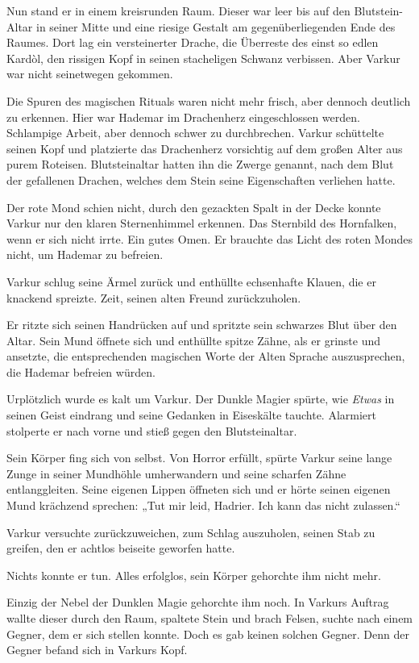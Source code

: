 \documentclass[10pt, a4paper, oneside]{book}
\begin{document}
Nun stand er in einem kreisrunden Raum. Dieser war leer bis auf den Blutstein-Altar in seiner Mitte und eine riesige Gestalt am gegenüberliegenden Ende des Raumes. Dort lag ein versteinerter Drache, die Überreste des einst so edlen Kardòl, den rissigen Kopf in seinen stacheligen Schwanz verbissen. Aber Varkur war nicht seinetwegen gekommen.

Die Spuren des magischen Rituals waren nicht mehr frisch, aber dennoch deutlich zu erkennen. Hier war Hademar im Drachenherz eingeschlossen werden. Schlampige Arbeit, aber dennoch schwer zu durchbrechen. Varkur schüttelte seinen Kopf und platzierte das Drachenherz vorsichtig auf dem großen Alter aus purem Roteisen. Blutsteinaltar hatten ihn die Zwerge genannt, nach dem Blut der gefallenen Drachen, welches dem Stein seine Eigenschaften verliehen hatte.

Der rote Mond schien nicht, durch den gezackten Spalt in der Decke konnte Varkur nur den klaren Sternenhimmel erkennen. Das Sternbild des Hornfalken, wenn er sich nicht irrte. Ein gutes Omen. Er brauchte das Licht des roten Mondes nicht, um Hademar zu befreien.

Varkur schlug seine Ärmel zurück und enthüllte echsenhafte Klauen, die er knackend spreizte. Zeit, seinen alten Freund zurückzuholen.

Er ritzte sich seinen Handrücken auf und spritzte sein schwarzes Blut über den Altar. Sein Mund öffnete sich und enthüllte spitze Zähne, als er grinste und ansetzte, die entsprechenden magischen Worte der Alten Sprache auszusprechen, die Hademar befreien würden.

Urplötzlich wurde es kalt um Varkur. Der Dunkle Magier spürte, wie \textit{Etwas} in seinen Geist eindrang und seine Gedanken in Eiseskälte tauchte. Alarmiert stolperte er nach vorne und stieß gegen den Blutsteinaltar.

Sein Körper fing sich von selbst. Von Horror erfüllt, spürte Varkur seine lange Zunge in seiner Mundhöhle umherwandern und seine scharfen Zähne entlanggleiten. Seine eigenen Lippen öffneten sich und er hörte seinen eigenen Mund krächzend sprechen: „Tut mir leid, Hadrier. Ich kann das nicht zulassen.“

Varkur versuchte zurückzuweichen, zum Schlag auszuholen, seinen Stab zu greifen, den er achtlos beiseite geworfen hatte.

Nichts konnte er tun. Alles erfolglos, sein Körper gehorchte ihm nicht mehr.

Einzig der Nebel der Dunklen Magie gehorchte ihm noch. In Varkurs Auftrag wallte dieser durch den Raum, spaltete Stein und brach Felsen, suchte nach einem Gegner, dem er sich stellen konnte. Doch es gab keinen solchen Gegner. Denn der Gegner befand sich in Varkurs Kopf.
\end{document}
